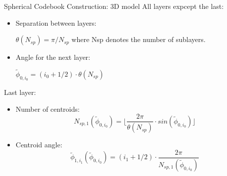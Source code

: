 \documentclass[10pt]{beamer}
\begin{document}
\begin{frame}{Spherical Codebook Construction: 3D model}
All layers expcept the last:
  \begin{itemize}
    \item Separation between layers:\\
    \begin{center}
      $\theta (N_{sp}) = \pi/N_{sp}$ where Nsp denotes the number of sublayers.
    \end{center}
    \item Angle for the next layer:\\
    \begin{center}
      $ \tilde{\phi}_{0,i_{0}} = (i_{0} + 1/2) \cdot \theta(N_{sp})$
    \end{center}

  \end{itemize}
Last layer:
\begin{itemize}
  \item Number of centroids:\\
  \begin{equation*}
  N_{sp,1}(\tilde{\phi}_{0,i_{0}}) = \lfloor\frac{2\pi}{\theta(N_{sp})} \cdot sin(\tilde{\phi}_{0,i_{0}})\rfloor
  \end{equation*}
  \item Centroid angle:
  \begin{equation*}
    \tilde{\phi}_{1,i_{1}}(\tilde{\phi}_{0,i_{0}}) = (i_{1} + 1/2) \cdot \frac{2\pi}{N_{sp,1}(\tilde{\phi}_{0,i_{0}})}
  \end{equation*}

\end{itemize}
\end{frame}
\end{document}

